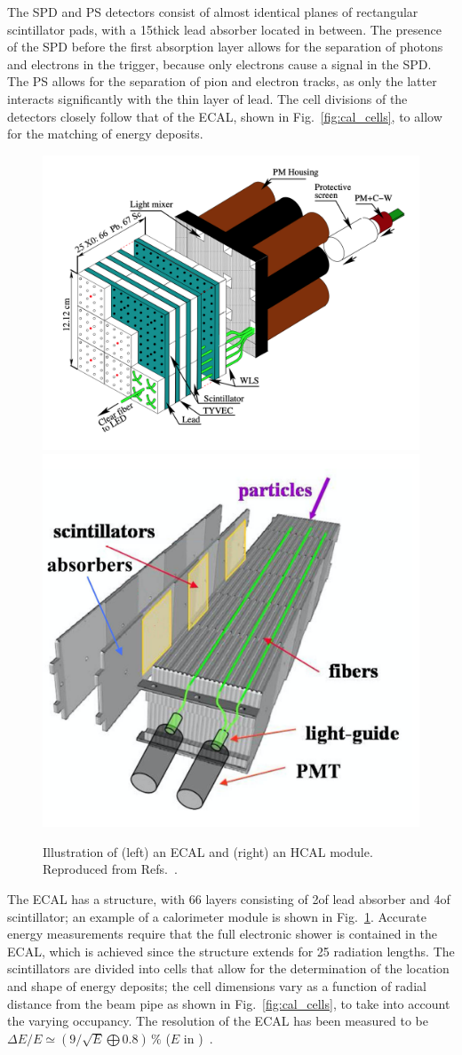 The SPD and PS detectors consist of almost identical planes of rectangular scintillator pads, with a 15\mm thick lead absorber located in between. The presence of the SPD before the first absorption layer allows for the separation of photons and electrons in the trigger, because only electrons cause a signal in the SPD. The PS allows for the separation of pion and electron tracks, as only the latter interacts significantly with the thin layer of lead. The cell divisions of the detectors closely follow that of the ECAL, shown in Fig.~\ref{fig:cal_cells}, to allow for the matching of energy deposits.

\begin{figure}[tb]
    \centering
    \includegraphics[width=0.55\columnwidth]{figures/detector/ECAL_module.png}
    \includegraphics[width=0.40\columnwidth]{figures/detector/HCAL_module.png}
    \caption{Illustration of (left) an ECAL and (right) an HCAL module. Reproduced from Refs.~\cite{ECALpaper,LHCb-Performance}.}
    \label{fig:ECAL_HCAL_modules}
\end{figure}

The ECAL has a  structure, with 66 layers consisting of 2\mm of lead absorber and 4\mm of scintillator; an example of a calorimeter module is shown in Fig.~\ref{fig:ECAL_HCAL_modules}. Accurate energy measurements require that the full electronic shower is contained in the ECAL, which is achieved since the structure extends for 25 radiation lengths. The scintillators are divided into cells that allow for the determination of the location and shape of energy deposits; the cell dimensions vary as a function of radial distance from the beam pipe as shown in Fig.~\ref{fig:cal_cells}, to take into account the varying occupancy. The resolution of the ECAL has been measured to be $\Delta E/E \simeq (9/\sqrt{E} \bigoplus 0.8)\,\%$ ($E$ in \gevcc)~\cite{LHCb-detector}.

